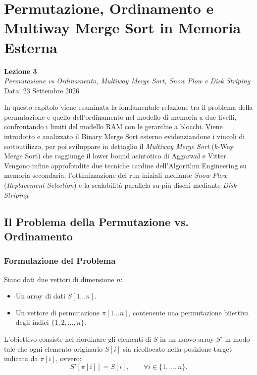 \chapter{Permutazione, Ordinamento e Multiway Merge Sort in Memoria Esterna}
\label{cha:lecture-three}

\begin{center}
  \textbf{Lezione 3}\\
  \emph{Permutazione vs Ordinamento, Multiway Merge Sort, Snow Plow e Disk Striping}\\[0.5em]
  Data: 23 Settembre 2026
\end{center}

In questo capitolo viene esaminata la fondamentale relazione tra il problema della permutazione e quello dell'ordinamento nel modello di memoria a due livelli, confrontando i limiti del modello RAM con le gerarchie a blocchi. Viene introdotto e analizzato il Binary Merge Sort esterno evidenziandone i vincoli di sottoutilizzo, per poi sviluppare in dettaglio il \textit{Multiway Merge Sort} ($k$-Way Merge Sort) che raggiunge il lower bound asintotico di Aggarwal e Vitter. Vengono infine approfondite due tecniche cardine dell'Algorithm Engineering su memoria secondaria: l'ottimizzazione dei run iniziali mediante \textit{Snow Plow} (\textit{Replacement Selection}) e la scalabilità parallela su più dischi mediante \textit{Disk Striping}.


\section{Il Problema della Permutazione vs. Ordinamento}
\label{sec:permutation-vs-sorting}

\subsection{Formulazione del Problema}
\label{subsec:problem-formulation}

Siano dati due vettori di dimensione $n$:
\begin{itemize}
  \item Un array di dati $S[1 \dots n]$.
  \item Un vettore di permutazione $\pi[1 \dots n]$, contenente una permutazione biiettiva degli indici $\{1, 2, \dots, n\}$.
\end{itemize}

L'obiettivo consiste nel riordinare gli elementi di $S$ in un nuovo array $S'$ in modo tale che ogni elemento originario $S[i]$ sia ricollocato nella posizione target indicata da $\pi[i]$, ovvero:
\begin{equation}
  S'[\pi[i]] = S[i], \qquad \forall i \in \{1, \dots, n\}.
\end{equation}

